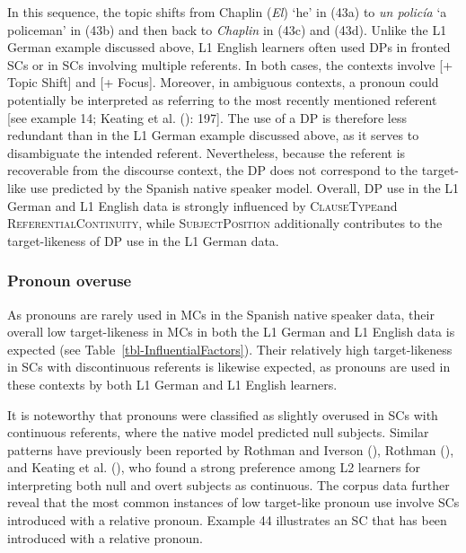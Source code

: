 \documentclass[
  letterpaper,
  DIV=11,
  numbers=noendperiod]{scrartcl}
\begin{document}
In this sequence, the topic shifts from Chaplin (\emph{El}) `he' in
(43a) to \emph{un policía} `a policeman' in (43b) and then back to
\emph{Chaplin} in (43c) and (43d). Unlike the L1 German example
discussed above, L1 English learners often used DPs in fronted SCs or in
SCs involving multiple referents. In both cases, the contexts involve
{[}+ Topic Shift{]} and {[}+ Focus{]}. Moreover, in ambiguous contexts,
a pronoun could potentially be interpreted as referring to the most
recently mentioned referent {[}see example 14; Keating et al.
(): 197{]}. The use of a DP is therefore
less redundant than in the L1 German example discussed above, as it
serves to disambiguate the intended referent. Nevertheless, because the
referent is recoverable from the discourse context, the DP does not
correspond to the target-like use predicted by the Spanish native
speaker model. Overall, DP use in the L1 German and L1 English data is
strongly influenced by \textsc{ClauseType}and
\textsc{ReferentialContinuity}, while \textsc{SubjectPosition}
additionally contributes to the target-likeness of DP use in the L1
German data.

\subsubsection{Pronoun overuse}\label{pronoun-overuse}

As pronouns are rarely used in MCs in the Spanish native speaker data,
their overall low target-likeness in MCs in both the L1 German and L1
English data is expected (see Table~\ref{tbl-InfluentialFactors}). Their
relatively high target-likeness in SCs with discontinuous referents is
likewise expected, as pronouns are used in these contexts by both L1
German and L1 English learners.

It is noteworthy that pronouns were classified as slightly overused in
SCs with continuous referents, where the native model predicted null
subjects. Similar patterns have previously been reported by Rothman and
Iverson (), Rothman
(), and Keating et al.
(), who found a strong preference among
L2 learners for interpreting both null and overt subjects as continuous.
The corpus data further reveal that the most common instances of low
target-like pronoun use involve SCs introduced with a relative pronoun.
Example 44 illustrates an SC that has been introduced with a relative
pronoun.
\end{document}
